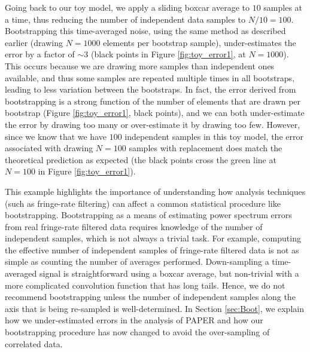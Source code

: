 \documentclass[preprint2,numberedappendix,tighten]{aastex6}  %
\begin{document}
Going back to our toy model, we apply a sliding boxcar average to $10$ samples at a time, thus reducing the number of 
independent data samples to $N/10 = 100$. Bootstrapping this time-averaged noise, using the same method as described 
earlier (drawing $N=1000$ elements per bootstrap sample), under-estimates the error by a factor of $\sim3$ (black points in Figure \ref{fig:toy_error1}, at $N=1000$). This occurs 
because we are drawing more samples than independent ones available, and thus some samples are repeated multiple times 
in all bootstraps, leading to less variation between the bootstraps. In fact, the error derived from bootstrapping is a strong 
function of the number of elements that are drawn per bootstrap (Figure \ref{fig:toy_error1}, black points), and we can both 
under-estimate the error by drawing too many or over-estimate it by drawing too few. However, since we know that we have $100$ 
independent samples in this toy model, the error associated with drawing $N=100$ samples with replacement does match the theoretical prediction 
as expected (the black points cross the green line at $N=100$ in Figure \ref{fig:toy_error1}).

This example highlights the importance of understanding how analysis techniques (such as fringe-rate filtering) can affect a 
common statistical procedure like bootstrapping. Bootstrapping as a means of estimating power spectrum errors from real 
fringe-rate filtered data requires knowledge of the number of independent samples, which is not always a trivial task. For 
example, computing the effective number of independent samples of fringe-rate filtered data is not as simple as counting the 
number of averages performed. Down-sampling a time-averaged signal is straightforward using a boxcar average, but non-trivial with a more complicated convolution function that has long tails. Hence, we do not recommend bootstrapping unless the 
number of independent samples along the axis that is being re-sampled is well-determined. In Section \ref{sec:Boot}, we explain how we under-estimated errors in the  analysis of PAPER and how our bootstrapping procedure has now changed to avoid the over-sampling of correlated data. 
\end{document}
